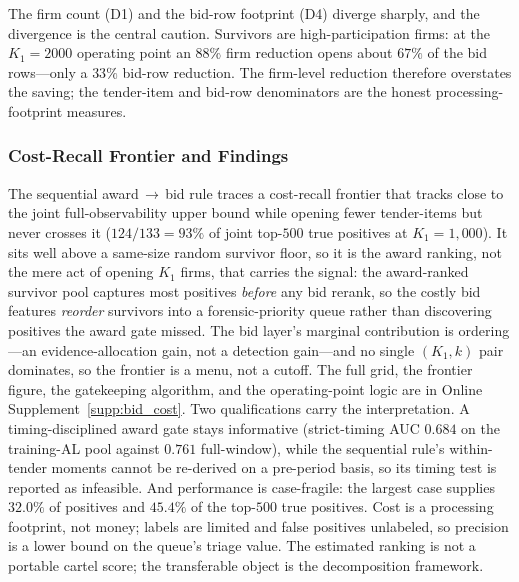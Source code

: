 The firm count (D1) and the bid-row footprint (D4) diverge sharply, and
the divergence is the central caution. Survivors are high-participation
firms: at the $K_1=2000$ operating point an $88\%$ firm reduction opens
about $67\%$ of the bid rows---only a $33\%$ bid-row reduction. The
firm-level reduction therefore overstates the saving; the tender-item and
bid-row denominators are the honest processing-footprint measures.

\subsubsection{Cost-Recall Frontier and Findings}
\label{app:gatekeeping_algorithm_submission}

The sequential award\,$\to$\,bid rule traces a cost-recall frontier that
tracks close to the joint full-observability upper bound while opening
fewer tender-items but never crosses it ($124/133 = 93\%$ of joint top-$500$
true positives at $K_1=1{,}000$). It sits well above a same-size random
survivor floor, so it is the award ranking, not the mere act of opening
$K_1$ firms, that carries the signal: the award-ranked survivor pool
captures most positives \emph{before} any bid rerank, so the costly bid
features \emph{reorder} survivors into a forensic-priority queue rather
than discovering positives the award gate missed. The bid layer's marginal
contribution is ordering---an evidence-allocation gain, not a detection
gain---and no single $(K_1,k)$ pair dominates, so the frontier is a menu,
not a cutoff. The full grid, the frontier figure, the gatekeeping
algorithm, and the operating-point logic are in Online
Supplement~\ref{supp:bid_cost}. Two qualifications carry the
interpretation. A timing-disciplined award gate stays informative
(strict-timing AUC $0.684$ on the training-AL pool against $0.761$
full-window), while the sequential rule's within-tender moments cannot be
re-derived on a pre-period basis, so its timing test is reported as
infeasible. And performance is case-fragile: the largest case supplies
$32.0\%$ of positives and $45.4\%$ of the top-$500$ true positives. Cost
is a processing footprint, not money; labels are limited and false
positives unlabeled, so precision is a lower bound on the queue's triage
value. The estimated ranking is not a portable cartel score; the
transferable object is the decomposition framework.

